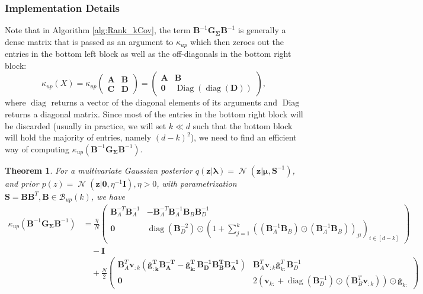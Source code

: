 \documentclass[a4paper, 11pt, oneside]{scrartcl}
\theoremstyle{break}
\newtheorem{theorem}[lemma]{Theorem}
\DeclareMathOperator{\Normal}{\mathcal{N}}
\DeclareMathOperator{\diag}{diag}
\DeclareMathOperator{\Diag}{Diag}
\newcommand{\matr}[1]{\boldsymbol{#1}}
\newcommand{\set}[1]{\mathcal{#1}}
\numberwithin{equation}{section}
\begin{document}
				\subsubsection{Implementation Details}
					Note that in Algorithm \ref{alg:Rank_kCov}, the term $\matr{B}^{-1} \matr{G_{\Sigma}} \matr{B}^{-1}$ is generally a dense matrix that is passed as an argument to $\kappa_{up}$ which then zeroes out the entries in the bottom left block as well as the off-diagonals in the bottom right block:
					$$\kappa_{up}(X) = \kappa_{up} \begin{pmatrix} \matr{A} & \matr{B} \\ \matr{C} & \matr{D} \end{pmatrix} = \begin{pmatrix} \matr{A} & \matr{B} \\ \matr{0} & \Diag(\diag (\matr{D}))\end{pmatrix},$$
					where $\diag$ returns a vector of the diagonal elements of its arguments and $\Diag$ returns a diagonal matrix.
					Since most of the entries in the bottom right block will be discarded (usually in practice, we will set $k \ll d$ such that the bottom block will hold the majority of entries, namely $(d - k)^2$), we need to find an efficient way of computing $\kappa_{up}(\matr{B}^{-1} \matr{G_{\Sigma}} \matr{B}^{-1})$.
					\begin{theorem}
						For a multivariate Gaussian posterior $q(\matr{z} | \matr{\lambda}) = \Normal(\matr{z} | \matr{\mu}, \matr{S}^{-1})$, and prior $p(z) = \Normal(\matr{z} | \matr{0}, \eta^{-1} \matr{I}), \eta > 0$, with parametrization $\matr{S} = \matr{B} \matr{B}^T, \matr{B} \in \set{B}_{up}(k)$, we have
						\begin{align*}
							\kappa_{up}(\matr{B}^{-1} \matr{G_{\Sigma}} \matr{B}^{-1}) &= \frac{\eta}{N}\begin{pmatrix} \matr{B}_A^{-T} \matr{B}_A^{-1} & -\matr{B}_A^{-T} \matr{B}_A^{-1} \matr{B}_B \matr{B}_D^{-1} \\ \matr{0} & \diag(\matr{B}_D^{-2}) \odot (1 + \sum_{j=1}^k ((\matr{B}_A^{-1} \matr{B}_B) \odot (\matr{B}_A^{-1} \matr{B}_B))_{ji})_{i \in [d-k]}\end{pmatrix} \\
							&\quad - \matr{I} \\
							&\quad + \frac{N}{2} \begin{pmatrix} \matr{B}_A^T \matr{v}_{:k} (\matr{\bar{g}_{:k}^T \matr{B}_A^{-T} - \matr{\bar{g}}_{k:}^T \matr{B}_D^{-1} \matr{B}_B^T \matr{B}_A^{-1}}) & \matr{B}_A^T \matr{v}_{:k} \matr{\bar{g}}_{k:}^T \matr{B}_D^{-1} \\ \matr{0} & 2(\matr{v}_{k:} + \diag(\matr{B}_D^{-1}) \odot (\matr{B}_B^T \matr{v}_{:k})) \odot \matr{\bar{g}}_{k:}\end{pmatrix}
						\end{align*}
					\end{theorem}
\end{document}
